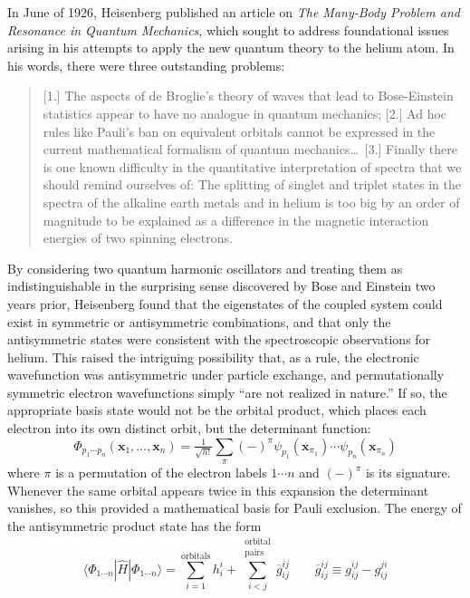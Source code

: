 In June of 1926, Heisenberg published an article on {\itshape The Many-Body
Problem and Resonance in Quantum Mechanics}, which sought to address
foundational issues arising in his attempts to apply the new quantum theory to
the helium atom.
In his words, there were three outstanding problems:
\begin{quote}
    [1.] The aspects of de Broglie's theory of waves that lead to Bose-Einstein
    statistics appear to have no analogue in quantum mechanics;
    [2.] Ad hoc rules like Pauli's ban on equivalent orbitals cannot be
    expressed in the current mathematical formalism of quantum mechanics\dots\ 
    [3.] Finally there is one known difficulty in the quantitative
    interpretation of spectra that we should remind ourselves of:
    The splitting of singlet and triplet states in the spectra of the alkaline
    earth metals and in helium is too big by an order of magnitude to be
    explained as a difference in the magnetic interaction energies of two
    spinning electrons.\cite{Heisenberg:1926p411}
\end{quote}
By considering two quantum harmonic oscillators and treating them as
indistinguishable in the surprising sense discovered by Bose\cite{Bose:1924p178}
and Einstein\cite{Einstein:1924p261} two years prior, Heisenberg found that the
eigenstates of the coupled system could exist in symmetric or antisymmetric
combinations, and that only the antisymmetric states were consistent with the
spectroscopic observations for helium.
This raised the intriguing possibility that, as a rule, the electronic
wavefunction was antisymmetric under particle exchange, and permutationally
symmetric electron wavefunctions simply ``are not realized in
nature.''\cite{Heisenberg:1926p411}
If so, the appropriate basis state would not be the orbital product, which
places each electron into its own distinct orbit, but the determinant function:
\begin{equation}
    \Phi_{p_1\cdots p_n}(\mathbf{x}_1, \ldots, \mathbf{x}_n)
    =
    \tfrac{1}{\sqrt{n!}}
    \sum_\pi
    (-)^\pi
    \psi_{p_1}(\mathbf{x}_{\pi_1})
    \cdots
    \psi_{p_n}(\mathbf{x}_{\pi_n})
\end{equation}
where \(\pi\) is a permutation of the electron labels \(1\cdots n\) and
\((-)^\pi\) is its signature.
Whenever the same orbital appears twice in this expansion the determinant
vanishes, so this provided a mathematical basis for Pauli exclusion.
The energy of the antisymmetric product state has the form
\begin{equation}
    \label{eq:introduction:determinant-expectation-value}
    \langle \Phi_{1\cdots n}|
    \hat{H}
    |\Phi_{1\cdots n} \rangle
    =
    \sum_{i=1}^\mathrm{orbitals}
    h_i^i
    +
    \sum_{i<j}^{\substack{\mathrm{orbital}\\\mathrm{pairs}}}
    \overline{g}_{ij}^{ij}
    \qquad
    \overline{g}_{ij}^{ij}
    \equiv
    g_{ij}^{ij}
    -
    g_{ij}^{ji}
\end{equation}

